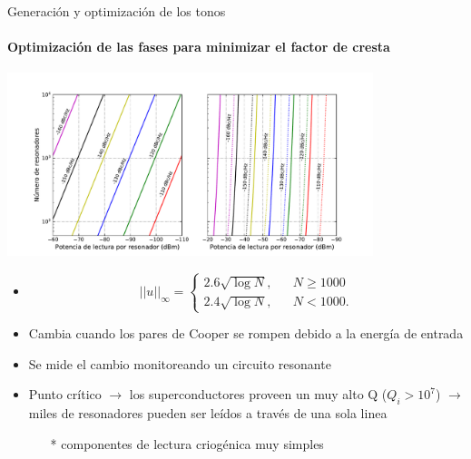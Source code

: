 \documentclass[ignorenonframetext,12pt]{beamer}
\begin{document}
\begin{frame}{Generación y optimización de los tonos}
	\framesubtitle{Optimización de las fases para minimizar el factor de cresta}
	\centering
	\qquad \includegraphics[width=0.8\textwidth]{c2_power_per_tones_compa}
	\begin{itemize}
		\item 
			\begin{equation}\label{eq_fc_aleatorios}
  ||u||_\infty = \left\{\begin{array}{rcl}
    2.6 \sqrt{\log{N}}, && N \geq 1000\\
    2.4 \sqrt{\log{N}}, && N < 1000.
  \end{array}\right.
\end{equation}

		\item Cambia cuando los pares de Cooper se rompen debido a la
			energía de entrada
		\item Se mide el cambio monitoreando un circuito resonante
		\item Punto crítico $\to$ los \alert{superconductores proveen un muy
			alto Q} ($Q_i > 10^7$) $\to$ miles de resonadores
			pueden ser leídos a través de una sola linea 
			\begin{itemize}
				\item[*] \scriptsize{{\color{blue}componentes de lectura criogénica muy
					simples}}
			\end{itemize}
	\end{itemize}
\end{frame}

\end{document}
